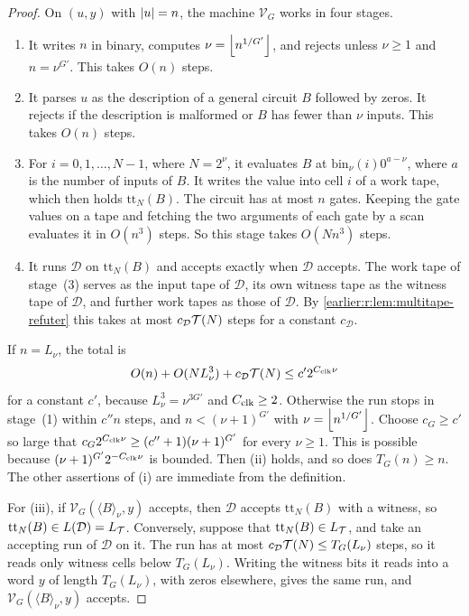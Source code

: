 \begin{proof}
On \((u,y)\) with \(\left|u\right|=n\), the machine \(\mathcal V_G\) works in four
stages.
\begin{enumerate}[label=(\arabic*)]
\item It writes \(n\) in binary, computes \(\nu=\left\lfloor n^{1/G'}\right\rfloor\), and
rejects unless \(\nu\ge1\) and \(n=\nu^{G'}\). This takes \(O(n)\)
steps.
\item It parses \(u\) as the description of a general circuit \(B\)
followed by zeros. It rejects if the description is malformed or \(B\)
has fewer than \(\nu\) inputs. This takes \(O(n)\) steps.
\item For \(i=0,1,\ldots,N-1\), where \(N=2^\nu\), it evaluates \(B\) at
\(\mathrm{bin}_\nu(i)0^{a-\nu}\), where \(a\) is the number of inputs of
\(B\). It writes the value into cell \(i\) of a work tape, which then
holds \(\mathrm{tt}_N(B)\). The circuit has at most \(n\) gates. Keeping
the gate values on a tape and fetching the two arguments of each gate by
a scan evaluates it in \(O(n^3)\) steps. So this stage takes
\(O(Nn^3)\) steps.
\item It runs \(\mathcal D\) on \(\mathrm{tt}_N(B)\) and accepts exactly
when \(\mathcal D\) accepts. The work tape of stage~(3) serves as the
input tape of \(\mathcal D\), its own witness tape as the witness tape
of \(\mathcal D\), and further work tapes as those of \(\mathcal D\). By
\cref{earlier:r:lem:multitape-refuter} this takes at most
\(c_{\mathcal D}\mathcal T(N)\) steps for a constant \(c_{\mathcal D}\).
\end{enumerate}
If \(n=L_\nu\), the total is
\[
 O(n)+O(NL_\nu^3)+c_{\mathcal D}\mathcal T(N)\le c'2^{C_{\rm clk}\nu}
\]
for a constant \(c'\), because \(L_\nu^3=\nu^{3G'}\) and
\(C_{\rm clk}\ge2\). Otherwise the run stops in stage~(1) within
\(c''n\) steps, and \(n<(\nu+1)^{G'}\) with \(\nu=\left\lfloor n^{1/G'}\right\rfloor\).
Choose \(c_G\ge c'\) so large that
\(c_G2^{C_{\rm clk}\nu}\ge(c''+1)(\nu+1)^{G'}\) for every \(\nu\ge1\).
This is possible because \((\nu+1)^{G'}2^{-C_{\rm clk}\nu}\) is bounded.
Then (ii) holds, and so does \(T_G(n)\ge n\). The other assertions of (i)
are immediate from the definition.

For (iii), if \(\mathcal V_G(\langle B\rangle_\nu,y)\) accepts, then
\(\mathcal D\) accepts \(\mathrm{tt}_N(B)\) with a witness, so
\(\mathrm{tt}_N(B)\in L(\mathcal D)=L_{\mathcal T}\). Conversely, suppose that
\(\mathrm{tt}_N(B)\in L_{\mathcal T}\), and take an accepting run of
\(\mathcal D\) on it. The run has at most
\(c_{\mathcal D}\mathcal T(N)\le T_G(L_\nu)\) steps, so it reads only witness
cells below \(T_G(L_\nu)\). Writing the witness bits it reads into a word
\(y\) of length \(T_G(L_\nu)\), with zeros elsewhere, gives the same run,
and \(\mathcal V_G(\langle B\rangle_\nu,y)\) accepts.
\end{proof}

